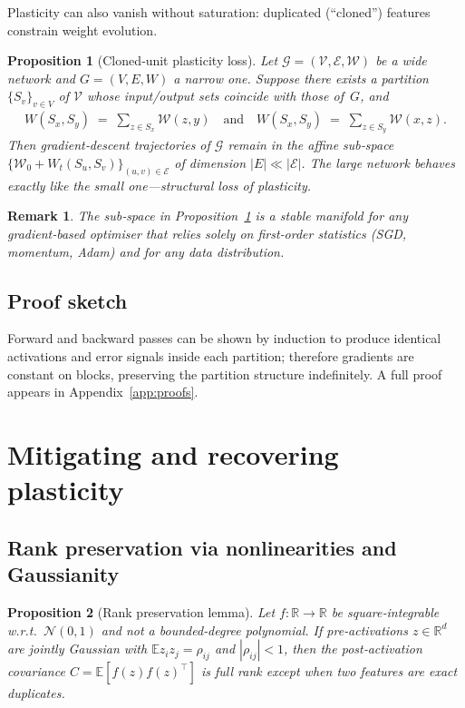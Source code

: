 \documentclass[11pt]{article}
\newcommand{\R}{\mathbb{R}}
\newcommand{\E}{\mathbb{E}}
\newtheorem{proposition}{Proposition}[section]
\newtheorem{remark}{Remark}[section]
\begin{document}
Plasticity can also vanish without saturation: duplicated (“cloned”) features constrain weight evolution.

\begin{proposition}[Cloned‑unit plasticity loss]
\label{prop:cloned}
Let $\mathcal{G}=(\mathcal{V},\mathcal{E},\mathcal{W})$ be a wide network and $G=(V,E,W)$ a narrow one.  
Suppose there exists a partition $\{S_v\}_{v\in V}$ of $\mathcal{V}$ whose input/output sets coincide with those of~$G$, and
\begin{align}
W(S_x,S_y) \;=\; \sum_{z\in S_x}\mathcal{W}(z,y) \quad\text{and}\quad
W(S_x,S_y) \;=\; \sum_{z\in S_y}\mathcal{W}(x,z).
\end{align}
Then gradient‑descent trajectories of $\mathcal{G}$ remain in the affine sub‑space
\(
\{\mathcal{W}_0+W_t(S_u,S_v)\}_{(u,v)\in\mathcal{E}}
\)
of dimension $|E|\ll|\mathcal{E}|$.  The large network behaves exactly like the small one—\emph{structural} loss of plasticity.
\end{proposition}

\begin{remark}
The sub‑space in Proposition~\ref{prop:cloned} is a stable manifold for any gradient‑based optimiser that relies solely on first‑order statistics (SGD, momentum, Adam) and for any data distribution.
\end{remark}

\subsection*{Proof sketch}
Forward and backward passes can be shown by induction to produce identical activations and error signals inside each partition; therefore gradients are constant on blocks, preserving the partition structure indefinitely.  A full proof appears in Appendix~\ref{app:proofs}.

\section{Mitigating and recovering plasticity}
\label{sec:mitigate}

\subsection{Rank preservation via nonlinearities and Gaussianity}

\begin{proposition}[Rank preservation lemma]
\label{prop:rank}
Let $f:\R\to\R$ be square‑integrable w.r.t.\ $\mathcal{N}(0,1)$ and not a bounded‑degree polynomial.  
If pre‑activations $z\in\R^d$ are jointly Gaussian with $\E z_i z_j=\rho_{ij}$ and $|\rho_{ij}|<1$, then the post‑activation covariance $C=\E[f(z)f(z)^\top]$ is full rank except when two features are exact duplicates.
\end{proposition}
\end{document}

